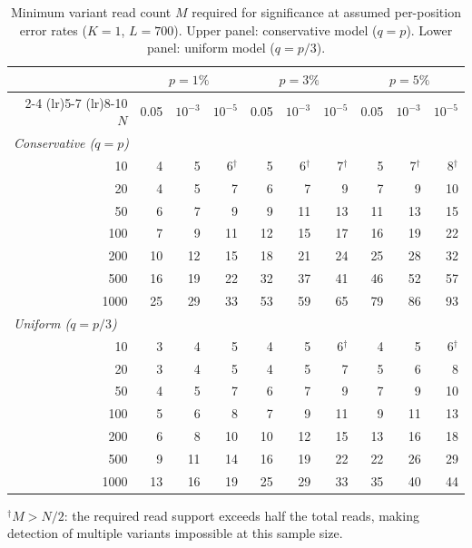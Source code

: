 \documentclass[11pt]{article}
\begin{document}
\begin{table}[htbp]
\centering
\caption{Minimum variant read count $M$ required for significance at assumed
per-position error rates ($K = 1$, $L = 700$). Upper panel: conservative model
($q = p$). Lower panel: uniform model ($q = p/3$).}
\label{tab:min_M}
\small
\begin{tabular}{r rrr rrr rrr}
\toprule
 & \multicolumn{3}{c}{$p = 1\%$}
 & \multicolumn{3}{c}{$p = 3\%$}
 & \multicolumn{3}{c}{$p = 5\%$} \\
\cmidrule(lr){2-4} \cmidrule(lr){5-7} \cmidrule(lr){8-10}
$N$ & 0.05 & $10^{-3}$ & $10^{-5}$
    & 0.05 & $10^{-3}$ & $10^{-5}$
    & 0.05 & $10^{-3}$ & $10^{-5}$ \\
\midrule
\multicolumn{10}{l}{\emph{Conservative ($q = p$)}} \\[2pt]
10   &  4 &  5 &  6$^\dagger$ &  5 &  6$^\dagger$ &  7$^\dagger$ &  5 &  7$^\dagger$ &  8$^\dagger$ \\
20   &  4 &  5 &  7 &  6 &  7 &  9 &  7 &  9 & 10 \\
50   &  6 &  7 &  9 &  9 & 11 & 13 & 11 & 13 & 15 \\
100  &  7 &  9 & 11 & 12 & 15 & 17 & 16 & 19 & 22 \\
200  & 10 & 12 & 15 & 18 & 21 & 24 & 25 & 28 & 32 \\
500  & 16 & 19 & 22 & 32 & 37 & 41 & 46 & 52 & 57 \\
1000 & 25 & 29 & 33 & 53 & 59 & 65 & 79 & 86 & 93 \\
\midrule
\multicolumn{10}{l}{\emph{Uniform ($q = p/3$)}} \\[2pt]
10   &  3 &  4 &  5 &  4 &  5 &  6$^\dagger$ &  4 &  5 &  6$^\dagger$ \\
20   &  3 &  4 &  5 &  4 &  5 &  7 &  5 &  6 &  8 \\
50   &  4 &  5 &  7 &  6 &  7 &  9 &  7 &  9 & 10 \\
100  &  5 &  6 &  8 &  7 &  9 & 11 &  9 & 11 & 13 \\
200  &  6 &  8 & 10 & 10 & 12 & 15 & 13 & 16 & 18 \\
500  &  9 & 11 & 14 & 16 & 19 & 22 & 22 & 26 & 29 \\
1000 & 13 & 16 & 19 & 25 & 29 & 33 & 35 & 40 & 44 \\
\bottomrule
\end{tabular}

\smallskip
\noindent$^\dagger$\small{$M > N/2$: the required read support exceeds half the
total reads, making detection of multiple variants impossible at this sample
size.}
\end{table}
\end{document}
